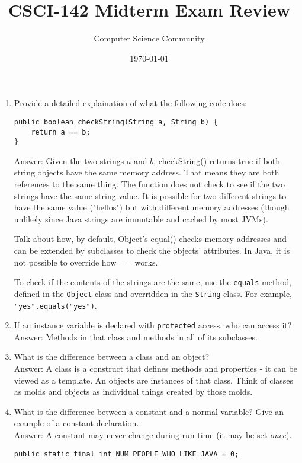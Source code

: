 \documentclass[11pt]{article}
\title{CSCI-142 Midterm Exam Review}
\author{Computer Science Community}
\date{\today}
\newenvironment{answer}{\large\lstset{basicstyle=\large}\color{white} \small{Answer:}\large}{}
\newenvironment{answer}{\large\lstset{basicstyle=\large}\color{red} \small{Answer:}\large}{}
\begin{document}
\header
\begin{enumerate}


\item Provide a detailed explaination of what the following code does:
\begin{lstlisting}
public boolean checkString(String a, String b) {
	return a == b;
}
\end{lstlisting}
\begin{answer}
Given the two strings $a$ and $b$, checkString() returns true if both string objects have the same memory address.  That means they are both references to the same thing.  The function does not check to see if the two strings have the same string value.  It is possible for two different strings to have the same value ("hellos") but with different memory addresses (though unlikely since Java strings are immutable and cached by most JVMs).  

Talk about how, by default, Object's equal() checks memory addresses and can be extended by subclasses to check the objects' attributes.  In Java, it is not possible to override how == works.

To check if the contents of the strings are the same, use the {\tt equals} method, defined in the {\tt Object} class and overridden in the {\tt String} class.
For example, {\tt "yes".equals("yes")}.
\end{answer}



\item If an instance variable is declared with {\tt protected} access, who can access it? \\
\begin{answer}
Methods in that class and methods in all of its subclasses.
\end{answer}



\item What is the difference between a class and an object? \\
\begin{answer}
A class is a construct that defines methods and properties - it can be viewed as a template. An objects are instances of that class. Think of classes as molds and objects as individual things created by those molds.
\end{answer}



\item What is the difference between a constant and a normal variable? Give an example of a constant declaration. \\
\begin{answer}
A constant may never change during run time (it may be set {\em once}).
	\begin{lstlisting}
public static final int NUM_PEOPLE_WHO_LIKE_JAVA = 0;
	\end{lstlisting}
\end{answer}




\end{enumerate}
\end{document}
